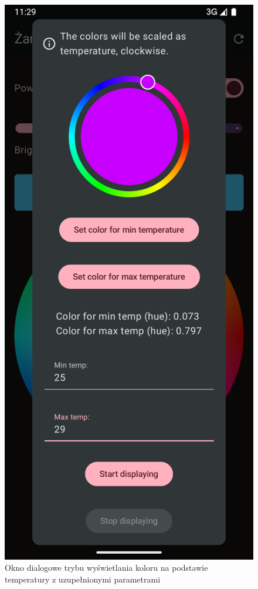 \documentclass[12pt]{article}
\begin{document}
\begin{figure}[H]
    \centering
    \hypertarget{fig:temp-to-color-dialog2}{}
    \includegraphics[scale=0.2]{figures/temp_to_color_screen2.png}
    \caption{Okno dialogowe trybu wyświetlania koloru na podstawie temperatury z uzupełnionymi parametrami}
    \label{fig:temp-to-color-dialog2}
\end{figure}
\end{document}
